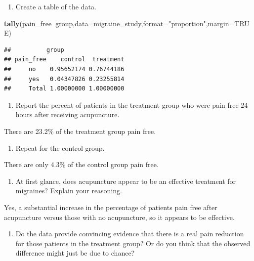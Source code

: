 \documentclass[
]{book}
\newenvironment{Shaded}{\begin{snugshade}}{\end{snugshade}}
\newcommand{\DataTypeTok}[1]{\textcolor[rgb]{0.13,0.29,0.53}{#1}}
\newcommand{\KeywordTok}[1]{\textcolor[rgb]{0.13,0.29,0.53}{\textbf{#1}}}
\newcommand{\NormalTok}[1]{#1}
\newcommand{\OperatorTok}[1]{\textcolor[rgb]{0.81,0.36,0.00}{\textbf{#1}}}
\newcommand{\OtherTok}[1]{\textcolor[rgb]{0.56,0.35,0.01}{#1}}
\newcommand{\StringTok}[1]{\textcolor[rgb]{0.31,0.60,0.02}{#1}}
\providecommand{\tightlist}{%
  \setlength{\itemsep}{0pt}\setlength{\parskip}{0pt}}
\begin{document}
\begin{enumerate}
\def\labelenumi{\alph{enumi}.}
\setcounter{enumi}{1}
\tightlist
\item
  Create a table of the data.
\end{enumerate}

\begin{Shaded}
\begin{Highlighting}[]
\KeywordTok{tally}\NormalTok{(pain_free}\OperatorTok{~}\NormalTok{group,}\DataTypeTok{data=}\NormalTok{migraine_study,}\DataTypeTok{format=}\StringTok{"proportion"}\NormalTok{,}\DataTypeTok{margin=}\OtherTok{TRUE}\NormalTok{)}
\end{Highlighting}
\end{Shaded}

\begin{verbatim}
##          group
## pain_free    control  treatment
##     no    0.95652174 0.76744186
##     yes   0.04347826 0.23255814
##     Total 1.00000000 1.00000000
\end{verbatim}

\begin{enumerate}
\def\labelenumi{\alph{enumi}.}
\setcounter{enumi}{2}
\tightlist
\item
  Report the percent of patients in the treatment group who were pain free 24 hours after receiving acupuncture.
\end{enumerate}

There are 23.2\% of the treatment group pain free.

\begin{enumerate}
\def\labelenumi{\alph{enumi}.}
\setcounter{enumi}{3}
\tightlist
\item
  Repeat for the control group.
\end{enumerate}

There are only 4.3\% of the control group pain free.

\begin{enumerate}
\def\labelenumi{\alph{enumi}.}
\setcounter{enumi}{4}
\tightlist
\item
  At first glance, does acupuncture appear to be an effective treatment for migraines? Explain your reasoning.
\end{enumerate}

Yes, a substantial increase in the percentage of patients pain free after acupuncture versus those with no acupuncture, so it appears to be effective.

\begin{enumerate}
\def\labelenumi{\alph{enumi}.}
\setcounter{enumi}{5}
\tightlist
\item
  Do the data provide convincing evidence that there is a real pain reduction for those patients in the treatment group? Or do you think that the observed difference might just be due to chance?
\end{enumerate}
\end{document}
